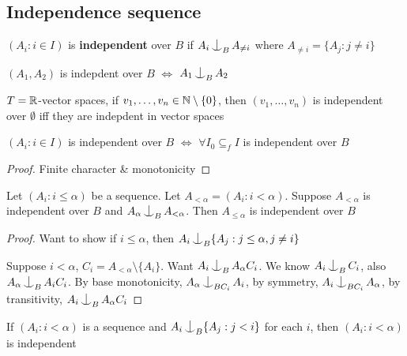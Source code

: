 \documentclass[11pt]{article}
\begin{document}
\subsection{Independence sequence}
\label{sec:orgdec3de9}
\begin{definition}[]
\((A_i:i\in I)\) is \textbf{independent} over \(B\) if \(A_i\ind_BA_{\neq i}\) where \(A_{\neq i}=\{A_j:j\neq i\}\)
\end{definition}

\begin{examplle}[]
\((A_1,A_2)\) is indepdent over \(B\) \(\Leftrightarrow\) \(A_1\ind_BA_2\)
\end{examplle}

\begin{fact}[]
\(T=\mathbb{R}\)-vector spaces, if \(v_1,\dots,v_n\in\mathbb{N}\setminus\{0\}\), then \((v_1,\dots,v_n)\) is independent over \(\emptyset\)
iff they are indepdent in vector spaces
\end{fact}

\begin{proposition}[]
\((A_i:i\in I)\) is independent over \(B\) \(\Leftrightarrow\) \(\forall I_0\subseteq_fI\) is independent over \(B\)
\end{proposition}

\begin{proof}
Finite character \& monotonicity
\end{proof}

\begin{lemma}[]
\label{5.5.5}
Let \((A_i:i\le\alpha)\) be a sequence. Let \(A_{<\alpha}=(A_i:i<\alpha)\). Suppose \(A_{<\alpha}\) is independent
over \(B\) and \(A_\alpha\ind_BA_{<\alpha}\). Then \(A_{\le\alpha}\) is independent over \(B\)
\end{lemma}

\begin{proof}
Want to show if \(i\le\alpha\), then \(A_i\ind_B\{A_j:j\le\alpha,j\neq i\}\)

Suppose \(i<\alpha\), \(C_i=A_{<\alpha}\setminus\{A_i\}\). Want \(A_i\ind_BA_\alpha C_i\). We know \(A_i\ind_BC_i\),
also \(A_\alpha\ind_BA_iC_i\). By base monotonicity, \(A_\alpha\ind_{BC_i}A_i\), by
symmetry, \(A_i\ind_{BC_i}A_\alpha\), by transitivity, \(A_i\ind_{B}A_\alpha C_i\)
\end{proof}

\begin{proposition}[]
If \((A_i:i<\alpha)\) is a sequence and \(A_i\ind_B\{A_j:j<i\}\) for each \(i\), then \((A_i:i<\alpha)\) is independent
\end{proposition}
\end{document}
